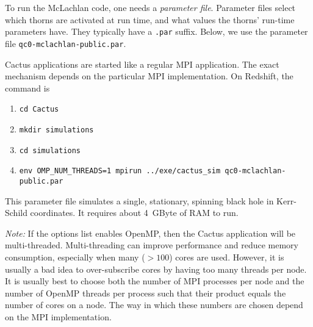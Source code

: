 \documentclass[11pt, tightenlines]{revtex4}
\newcommand{\code}[1]{\texttt{#1}}
\begin{document}
To run the McLachlan code, one needs a \emph{parameter file}.
Parameter files select which thorns are activated at run time, and
what values the thorns' run-time parameters have.  They typically have
a \code{.par} suffix.  Below, we use the parameter file
\code{qc0-mclachlan-public.par}.

Cactus applications are started like a regular MPI application.  The
exact mechanism depends on the particular MPI implementation.  On
Redshift, the command is
\begin{enumerate}
\item\verb+cd Cactus+
\item\verb+mkdir simulations+
\item\verb+cd simulations+
\item\verb+env OMP_NUM_THREADS=1 mpirun ../exe/cactus_sim qc0-mclachlan-public.par+
\end{enumerate}
This parameter file simulates a single, stationary, spinning black
hole in Kerr-Schild coordinates.  It requires about 4~GByte of RAM to
run.

\emph{Note:} If the options list enables OpenMP, then the Cactus
application will be multi-threaded.  Multi-threading can improve
performance and reduce memory consumption, especially when many
($>100$) cores are used.  However, it is usually a bad idea to
over-subscribe cores by having too many threads per node.  It is
usually best to choose both the number of MPI processes per node and
the number of OpenMP threads per process such that their product
equals the number of cores on a node.  The way in which these numbers
are chosen depend on the MPI implementation.





\end{document}
